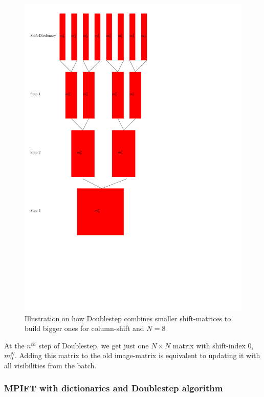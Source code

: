 \documentclass[12pt]{article}
\begin{document}
\begin{figure}[ht!]
	\begin{center}
	\includegraphics[height=\textheight-3cm]{Doublestep_overview}
\end{center}
	\caption{Illustration on how Doublestep combines smaller shift-matrices to build bigger ones for column-shift and $N=8$}
	\label{fig::doubleStepVisualized}
\end{figure}

At the $n^{th}$ step of Doublestep, we get just one $N\times N$ matrix with shift-index 0, $m_0^N$. Adding this matrix to the old image-matrix is equivalent to updating it with all visibilities from the batch.

\subsubsection{MPIFT with dictionaries and Doublestep algorithm}
\label{sec::algorithm}
\end{document}
